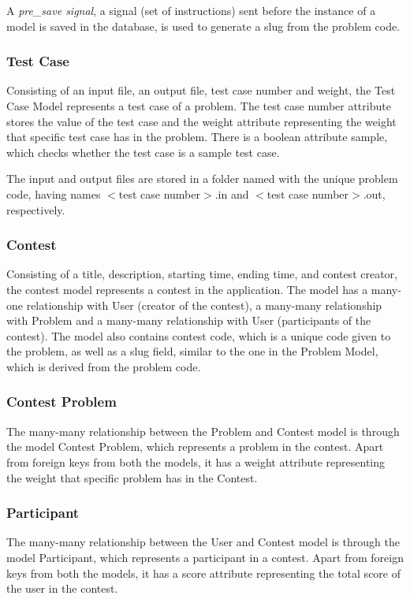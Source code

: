 A \textit{pre\_save signal}, a signal (set of instructions) sent before the instance of a model is saved in the database, is used to generate a slug from the problem code.

\subsubsection{Test Case}
Consisting of an input file, an output file, test case number and weight, the Test Case Model represents a test case of a problem. The test case number attribute stores the value of the test case and the weight attribute representing the weight that specific test case has in the problem. There is a boolean attribute sample, which checks whether the test case is a sample test case.

The input and output files are stored in a folder named with the unique problem code, having names $<$test case number$>$.in and $<$test case number$>$.out, respectively.

\subsubsection{Contest}
Consisting of a title, description, starting time, ending time, and contest creator, the contest model represents a contest in the application. The model has a many-one relationship with User (creator of the contest), a many-many relationship with Problem and a many-many relationship with User (participants of the contest). The model also contains contest code, which is a unique code given to the problem, as well as a slug field, similar to the one in the Problem Model, which is derived from the problem code. 

\subsubsection{Contest Problem}
The many-many relationship between the Problem and Contest model is through the model Contest Problem, which represents a problem in the contest. Apart from foreign keys from both the models, it has a weight attribute representing the weight that specific problem has in the Contest.

\subsubsection{Participant}
The many-many relationship between the User and Contest model is through the model Participant, which represents a participant in a contest. Apart from foreign keys from both the models, it has a score attribute representing the total score of the user in the contest.

